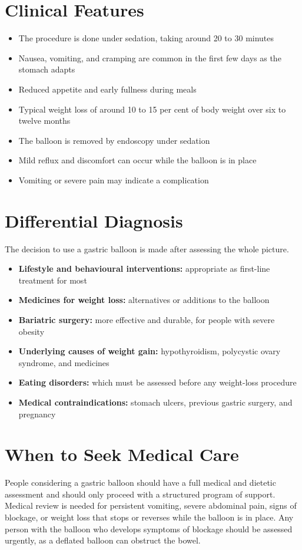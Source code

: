 \section*{Clinical Features}
\begin{itemize}
    \item The procedure is done under sedation, taking around 20 to 30 minutes
    \item Nausea, vomiting, and cramping are common in the first few days as the stomach adapts
    \item Reduced appetite and early fullness during meals
    \item Typical weight loss of around 10 to 15 per cent of body weight over six to twelve months
    \item The balloon is removed by endoscopy under sedation
    \item Mild reflux and discomfort can occur while the balloon is in place
    \item Vomiting or severe pain may indicate a complication
\end{itemize}

\section*{Differential Diagnosis}
The decision to use a gastric balloon is made after assessing the whole picture.
\begin{itemize}
    \item \textbf{Lifestyle and behavioural interventions:} appropriate as first-line treatment for most
    \item \textbf{Medicines for weight loss:} alternatives or additions to the balloon
    \item \textbf{Bariatric surgery:} more effective and durable, for people with severe obesity
    \item \textbf{Underlying causes of weight gain:} hypothyroidism, polycystic ovary syndrome, and medicines
    \item \textbf{Eating disorders:} which must be assessed before any weight-loss procedure
    \item \textbf{Medical contraindications:} stomach ulcers, previous gastric surgery, and pregnancy
\end{itemize}

\section*{When to Seek Medical Care}
People considering a gastric balloon should have a full medical and dietetic assessment and should only proceed with a structured program of support. Medical review is needed for persistent vomiting, severe abdominal pain, signs of blockage, or weight loss that stops or reverses while the balloon is in place. Any person with the balloon who develops symptoms of blockage should be assessed urgently, as a deflated balloon can obstruct the bowel.

